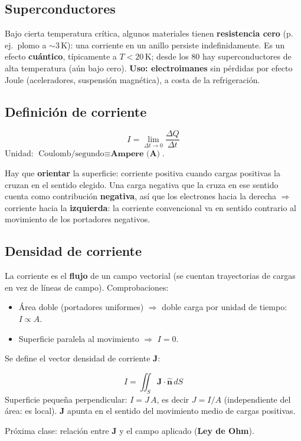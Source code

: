 \documentclass[12pt,a4paper]{article}
\begin{document}


\subsection{Superconductores}

Bajo cierta temperatura crítica, algunos materiales tienen
\textbf{resistencia cero} (p.\,ej.\ plomo a $\sim 3$\,K): una corriente
en un anillo persiste indefinidamente. Es un efecto \textbf{cuántico},
típicamente a $T<20$\,K; desde los 80 hay superconductores de alta
temperatura (aún bajo cero). \textbf{Uso: electroimanes} sin pérdidas por
efecto Joule (aceleradores, suspensión magnética), a costa de la
refrigeración.

\subsection{Definición de corriente}

\begin{keybox}
  \[
  \boxed{I = \lim_{\Delta t\to 0}\frac{\Delta Q}{\Delta t}}
  \]
  Unidad: $\text{Coulomb/segundo} \equiv \textbf{Ampere (A)}$.
\end{keybox}

Hay que \textbf{orientar} la superficie: corriente positiva cuando cargas
positivas la cruzan en el sentido elegido. Una carga negativa que la cruza
en ese sentido cuenta como contribución \textbf{negativa}, así que los
electrones hacia la derecha $\Rightarrow$ corriente hacia la
\textbf{izquierda}: la corriente convencional va en sentido contrario al
movimiento de los portadores negativos.

\subsection{Densidad de corriente}

La corriente es el \textbf{flujo} de un campo vectorial (se cuentan
trayectorias de cargas en vez de líneas de campo). Comprobaciones:
\begin{itemize}[nosep]
  \item Área doble (portadores uniformes) $\Rightarrow$ doble carga por
        unidad de tiempo: $I \propto A$.
  \item Superficie paralela al movimiento $\Rightarrow$ $I = 0$.
\end{itemize}

Se define el vector densidad de corriente $\mathbf{J}$:

\begin{keybox}
  \[
  \boxed{I = \iint_S \mathbf{J}\cdot\hat{\mathbf{n}}\, dS}
  \]
  Superficie pequeña perpendicular: $I = J\,A$, es decir $J = I/A$
  (independiente del área: es local). $\mathbf{J}$ apunta en el sentido
  del movimiento medio de cargas positivas.
\end{keybox}

Próxima clase: relación entre $\mathbf{J}$ y el campo aplicado
(\textbf{Ley de Ohm}).


\end{document}
